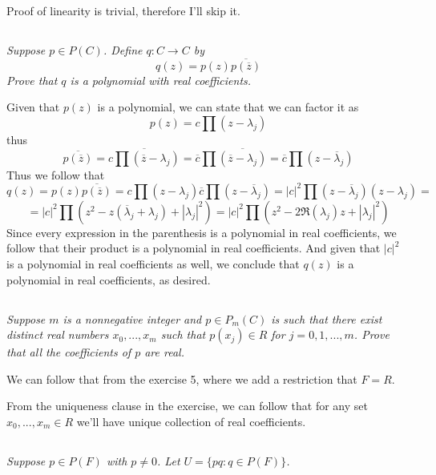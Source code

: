 \documentclass[11pt,oneside,titlepage]{book}
\begin{document}
Proof of linearity is trivial, therefore I'll skip it.

\subsection{}

\textit{Suppose $p \in P(C)$. Define $q: C \to C$ by}
$$q(z) = p(z) \overline{p(\overline z)}$$
\textit{Prove that $q$ is a polynomial with real coefficients.}

Given that $p(z)$ is a polynomial, we can state that we can factor it as 
$$p(z) = c \prod{(z - \lambda_j)}$$
thus
$$\overline{p(\overline{z})} = \overline{c \prod{(\overline z - \lambda_j)}} =
\overline{c} \prod{\overline {(\overline z - \lambda_j)}} =
\overline{c} \prod{(z - \overline  \lambda_j)}$$
Thus we follow that
$$q(z) = p(z) \overline{p(\overline z)} =
c \prod{(z - \lambda_j)} \overline{c} \prod{(z - \overline  \lambda_j)} =
|c|^2 \prod{(z - \overline  \lambda_j)(z - \lambda_j)} =$$
$$ = 
|c|^2 \prod{(z^2 - z(\overline  \lambda_j + \lambda_j) + |\lambda_j|^2)} =
|c|^2 \prod{(z^2 - 2\Re(\lambda_j)z  + |\lambda_j|^2)} $$
Since every expression in the parenthesis is a polynomial in real coefficients, we follow that
their product is a polynomial in real coefficients. And given that $|c|^2$ is a polynomial
in real coefficients as well, we conclude that $q(z)$ is a polynomial in real coefficients,
as desired.

\subsection{}

\textit{Suppose $m$ is a nonnegative integer and $p \in P_m(C)$ is such that there exist
  distinct real numbers $x_0, ..., x_m$ such that $p(x_j) \in R$ for
  $j = 0, 1, ..., m$. Prove that all the coefficients of $p$ are real.}

We can follow that from the exercise 5, where we add a  restriction that  $F = R$.

From the uniqueness clause in the exercise, we can follow that for any
set $x_0, ..., x_m \in R$ we'll have unique collection of real coefficients.

\subsection{}

\textit{Suppose $p \in P(F)$ with $p \neq 0$. Let $U = \{pq: q \in P(F)\}$.}
\end{document}
